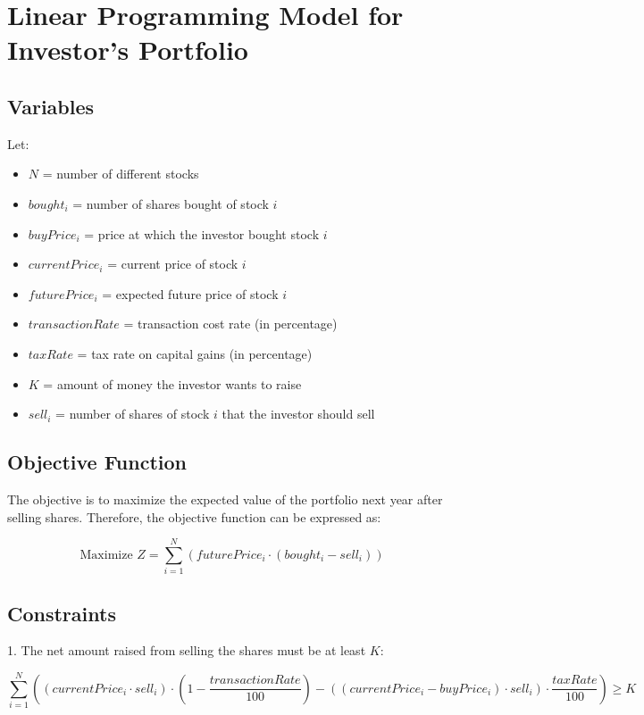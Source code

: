 \documentclass{article}
\begin{document}
\section*{Linear Programming Model for Investor's Portfolio}

\subsection*{Variables}
Let:
\begin{itemize}
    \item \( N \) = number of different stocks
    \item \( bought_i \) = number of shares bought of stock \( i \)
    \item \( buyPrice_i \) = price at which the investor bought stock \( i \)
    \item \( currentPrice_i \) = current price of stock \( i \)
    \item \( futurePrice_i \) = expected future price of stock \( i \)
    \item \( transactionRate \) = transaction cost rate (in percentage)
    \item \( taxRate \) = tax rate on capital gains (in percentage)
    \item \( K \) = amount of money the investor wants to raise
    \item \( sell_i \) = number of shares of stock \( i \) that the investor should sell
\end{itemize}

\subsection*{Objective Function}
The objective is to maximize the expected value of the portfolio next year after selling shares. Therefore, the objective function can be expressed as:

\[
\text{Maximize } Z = \sum_{i=1}^{N} \left( futurePrice_i \cdot (bought_i - sell_i) \right)
\]

\subsection*{Constraints}
1. The net amount raised from selling the shares must be at least \( K \):

\[
\sum_{i=1}^{N} \left( \left( currentPrice_i \cdot sell_i \right) \cdot \left( 1 - \frac{transactionRate}{100} \right) - \left( \left( currentPrice_i - buyPrice_i \right) \cdot sell_i \right) \cdot \frac{taxRate}{100} \right) \geq K
\]
\end{document}

